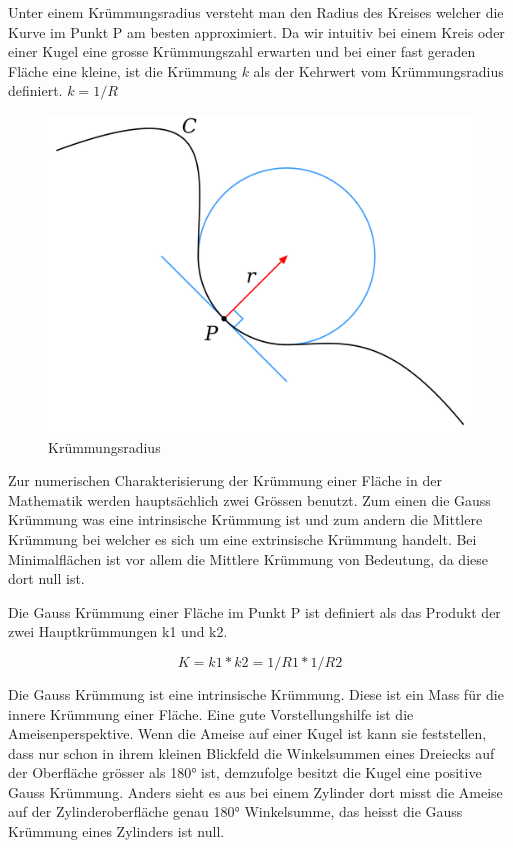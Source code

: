 \begin{refsection}
Unter einem Krümmungsradius versteht man den Radius des Kreises welcher die Kurve im Punkt P am besten approximiert. 
Da wir intuitiv bei einem Kreis oder einer Kugel eine grosse Krümmungszahl erwarten und bei einer fast geraden Fläche eine kleine, ist die Krümmung $k$  als der Kehrwert vom Krümmungsradius definiert. $k=1/R$ 

\begin{figure} [H]
  \centering
  \includegraphics[scale=0.1]{minimal/Kruemmungsradius.png}
  \caption{Krümmungsradius} 
\end{figure}


Zur numerischen Charakterisierung der Krümmung einer Fläche in der Mathematik werden hauptsächlich zwei Grössen benutzt.
Zum einen die Gauss Krümmung was eine intrinsische Krümmung ist und zum andern die Mittlere Krümmung bei welcher es sich um eine extrinsische Krümmung handelt. Bei Minimalflächen ist vor allem die Mittlere Krümmung von Bedeutung, da diese dort null ist.


Die Gauss Krümmung einer Fläche im Punkt P ist definiert als das Produkt der zwei Hauptkrümmungen k1 und k2.

\begin{equation} \label{Gauss Krümmung}
  K=k1*k2=1/R1*1/R2
\end{equation}



Die Gauss Krümmung ist eine intrinsische Krümmung. Diese ist  ein Mass für die innere Krümmung einer Fläche. 
Eine gute Vorstellungshilfe ist die Ameisenperspektive. 
Wenn die Ameise auf einer Kugel ist kann sie feststellen, dass nur schon in ihrem kleinen Blickfeld die Winkelsummen eines Dreiecks auf der Oberfläche grösser als 180° ist, demzufolge besitzt die Kugel eine positive Gauss Krümmung. Anders sieht es aus bei einem Zylinder dort misst die Ameise auf der Zylinderoberfläche genau 180° Winkelsumme, das heisst die Gauss Krümmung eines Zylinders ist null.


\end{refsection}
